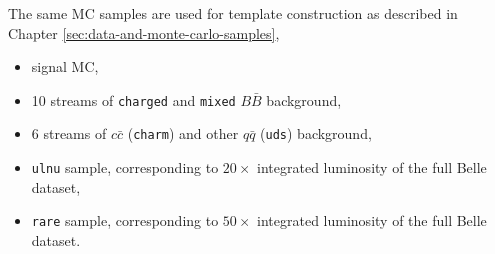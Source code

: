 The same MC samples are used for template construction as described in Chapter \ref{sec:data-and-monte-carlo-samples},
\begin{itemize}
	\item signal MC,
	\item 10 streams of \texttt{charged} and \texttt{mixed} $B \bar B$ background,
	\item 6 streams of $c \bar c$ (\texttt{charm}) and other $q \bar q$ (\texttt{uds}) background,
	\item \texttt{ulnu} sample, corresponding to $20\times$ integrated luminosity of the full Belle dataset,
	\item \texttt{rare} sample, corresponding to $50\times$ integrated luminosity of the full Belle dataset.
\end{itemize}

